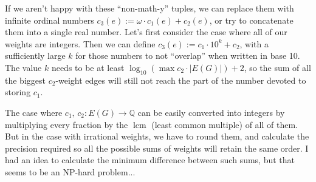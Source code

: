 \documentclass{article}
\newcommand{\Q}{\mathbb{Q}}
\begin{document}
  If we aren't happy with these ``non-math-y'' tuples, we can replace them with
  infinite ordinal numbers $c_3(e) := \omega \cdot c_1(e) + c_2(e)$, or try to concatenate them into a single real number.
  Let's first consider the case where all of our weights are integers.
  Then we can define $c_3(e) := c_1 \cdot 10^k + c_2$,
  with a sufficiently large $k$ for those numbers to not ``overlap'' when written in base 10.
  The value $k$ needs to be at least $\log_10 (\max c_2 \cdot |E(G)|) + 2$,
  so the sum of all the biggest $c_2$-weight edges will still not reach the part of the number devoted to storing $c_1$.

  The case where $c_1,\, c_2 : E(G) \to \Q$ can be easily converted into integers
  by multiplying every fraction by the $\operatorname{lcm}$ (least common multiple) of all of them.
  But in the case with irrational weights, we have to round them,
  and calculate the precision required so all the possible sums of weights will retain the same order.
  I had an idea to calculate the minimum difference between such sums, but that seems to be an NP-hard problem...

\end{document}
